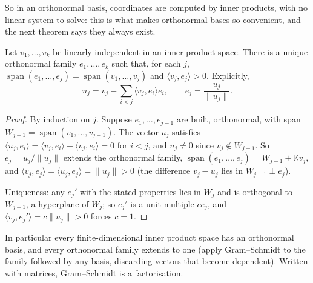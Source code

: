 So in an orthonormal basis, coordinates are computed by inner products, with no linear system to solve: this is what
makes orthonormal bases so convenient, and the next theorem says they always exist.

\begin{theorem}\label{linear:thm:gramschmidt}
Let $v_1,\dots,v_k$ be linearly independent in an inner product space. There is a unique orthonormal family
$e_1,\dots,e_k$ such that, for each $j$, $\operatorname{span}(e_1,\dots,e_j)=\operatorname{span}(v_1,\dots,v_j)$ and
$\langle v_j,e_j\rangle>0$. Explicitly,
\[
u_j=v_j-\sum_{i<j}\langle v_j,e_i\rangle e_i,\qquad e_j=\frac{u_j}{\|u_j\|}.
\]
\end{theorem}
\begin{proof}
By induction on $j$. Suppose $e_1,\dots,e_{j-1}$ are built, orthonormal, with span $W_{j-1}=\operatorname{span}(v_1,\dots,
v_{j-1})$. The vector $u_j$ satisfies $\langle u_j,e_i\rangle=\langle v_j,e_i\rangle-\langle v_j,e_i\rangle=0$ for $i<j$,
and $u_j\ne0$ since $v_j\notin W_{j-1}$. So $e_j=u_j/\|u_j\|$ extends the orthonormal family, $\operatorname{span}(e_1,
\dots,e_j)=W_{j-1}+\mathbb Kv_j$, and $\langle v_j,e_j\rangle=\langle u_j,e_j\rangle=\|u_j\|>0$ (the difference $v_j-u_j$
lies in $W_{j-1}\perp e_j$).

Uniqueness: any $e_j'$ with the stated properties lies in $W_j$ and is orthogonal to $W_{j-1}$, a hyperplane of $W_j$; so
$e_j'$ is a unit multiple $ce_j$, and $\langle v_j,e_j'\rangle=\bar c\|u_j\|>0$ forces $c=1$.
\end{proof}

In particular every finite-dimensional inner product space has an orthonormal basis, and every orthonormal family extends
to one (apply Gram--Schmidt to the family followed by any basis, discarding vectors that become dependent). Written with
matrices, Gram--Schmidt is a factorisation.

